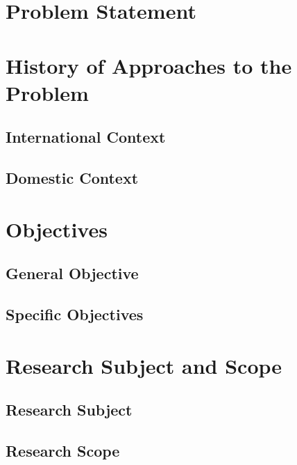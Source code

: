 \label{chap:introduction}
\ThesisFlatNumbering

\section{Problem Statement}

\section{History of Approaches to the Problem}
\subsection{International Context}
\subsection{Domestic Context}

\section{Objectives}
\subsection{General Objective}
\subsection{Specific Objectives}

\section{Research Subject and Scope}
\subsection{Research Subject}
\subsection{Research Scope}

